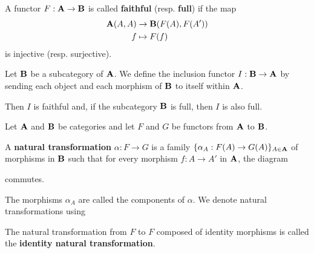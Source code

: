 \begin{definition}\label{def:faithful_full_functor}\cite[definition 1.2.16]{Leinster2014}
  A functor \( F: \operatorname{\mathbf{A}} \to \operatorname{\mathbf{B}} \) is called \textbf{faithful} (resp. \textbf{full}) if the map
  \begin{align*}
    \operatorname{\mathbf{A}}(A, A) &\to \operatorname{\mathbf{B}}(F(A), F(A')) \\
    f &\mapsto F(f)
  \end{align*}
  is injective (resp. surjective).
\end{definition}

\begin{example}\label{def:subcategory_functors}\cite[25]{Leinster2014}
  Let \( \operatorname{\mathbf{B}} \) be a subcategory of \( \operatorname{\mathbf{A}} \). We define the inclusion functor \( I: \operatorname{\mathbf{B}} \to \operatorname{\mathbf{A}} \) by sending each object and each morphism of \( \operatorname{\mathbf{B}} \) to itself within \( \operatorname{\mathbf{A}} \).

  Then \( I \) is faithful and, if the subcategory \( \operatorname{\mathbf{B}} \) is full, then \( I \) is also full.
\end{example}

\begin{definition}\label{def:natural_transformation}\cite[definition 1.3.1]{Leinster2014}
  Let \( \operatorname{\mathbf{A}} \) and \( \operatorname{\mathbf{B}} \) be categories and let \( F \) and \( G \) be functors from \( \operatorname{\mathbf{A}} \) to \( \operatorname{\mathbf{B}} \).

  A \textbf{natural transformation} \( \alpha: F \to G \) is a family \( \{ \alpha_A: F(A) \to G(A) \}_{A \in \operatorname{\mathbf{A}}} \) of morphisms in \( \operatorname{\mathbf{B}} \) such that for every morphism \( f: A \to A' \) in \( \operatorname{\mathbf{A}} \), the diagram
  \begin{Center}
  \end{Center}
  commutes.

  The morphisms \( \alpha_A \) are called the components of \( \alpha \). We denote natural transformations using
  \begin{Center}
  \end{Center}

  The natural transformation from \( F \) to \( F \) composed of identity morphisms is called the \textbf{identity natural transformation}.
\end{definition}

